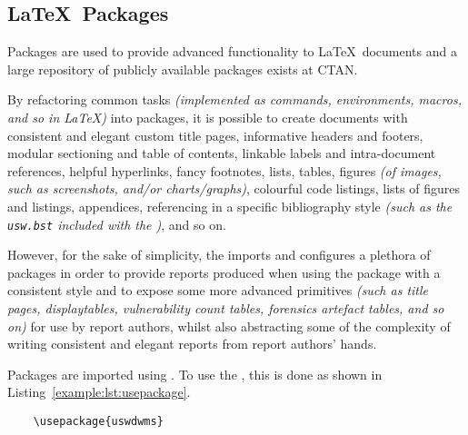 \subsection{\LaTeX\ Packages}
Packages are used to provide advanced functionality to \LaTeX\ documents and a large repository of publicly available packages exists at CTAN.

By refactoring common tasks \textit{(implemented as commands, environments, macros, and so in \LaTeX{})} into packages, it is possible to create documents with consistent and elegant custom title pages, informative headers and footers, modular sectioning and table of contents, linkable labels and intra-document references, helpful hyperlinks, fancy footnotes, lists, tables, figures \textit{(of images, such as screenshots, and/or charts/graphs)}, colourful code listings, lists of figures and listings, appendices, referencing in a specific bibliography style \textit{(such as the \texttt{usw.bst} included with the \uswdwmspkg{})}, and so on.

However, for the sake of simplicity, the \uswdwmspkg{} imports and configures a plethora of packages in order to provide reports produced when using the package with a consistent style and to expose some more advanced primitives \textit{(such as title pages, displaytables, vulnerability count tables, forensics artefact tables, and so on)} for use by report authors, whilst also abstracting some of the complexity of writing consistent and elegant reports from report authors' hands.

Packages are imported using . To use the \uswdwmspkg{}, this is done as shown in Listing~\ref{example:lst:usepackage}.


\begin{listing}[H]
  \captionsetup{skip=\skiplistingcaptionlen}
  \begin{verbatim}
    \usepackage{uswdwms}
  \end{verbatim}
  \caption{\texttt{\textbackslash usepackage} command example}
  \label{example:lst:usepackage}
\end{listing}
